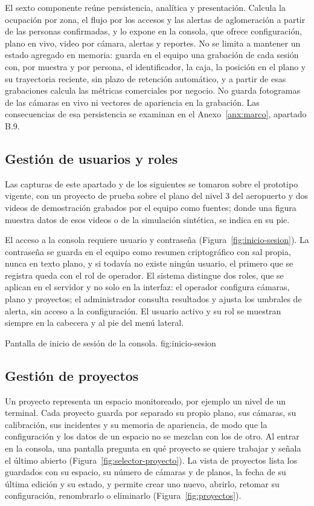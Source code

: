 El sexto componente reúne persistencia, analítica y presentación. Calcula la ocupación por
zona, el flujo por los accesos y las alertas de aglomeración a partir de las personas
confirmadas, y lo expone en la consola, que ofrece configuración, plano en vivo, video por
cámara, alertas y reportes. No se limita a mantener un estado agregado en memoria: guarda en
el equipo una grabación de cada sesión con, por muestra y por persona, el identificador, la caja,
la posición en el plano y su trayectoria reciente, sin plazo de retención automático, y a partir de
esas grabaciones calcula las métricas comerciales por negocio. No guarda fotogramas de las
cámaras en vivo ni vectores de apariencia en la grabación. Las consecuencias de esa
persistencia se examinan en el Anexo~\ref{anx:marco}, apartado B.9.

\subsection{Gestión de usuarios y roles}
\label{subsec:diseno-usuarios}

Las capturas de este apartado y de los siguientes se tomaron sobre el prototipo vigente, con un
proyecto de prueba sobre el plano del nivel 3 del aeropuerto y dos videos de demostración
grabados por el equipo como fuentes; donde una figura muestra datos de esos videos o de la
simulación sintética, se indica en su pie.

El acceso a la consola requiere usuario y contraseña (Figura~\ref{fig:inicio-sesion}). La
contraseña se guarda en el equipo como resumen criptográfico con sal propia, nunca en texto
plano, y si todavía no existe ningún usuario, el primero que se registra queda con el rol de
operador. El sistema distingue dos roles, que se aplican en el servidor y no solo en la interfaz:
el operador configura cámaras, plano y proyectos; el administrador consulta resultados y ajusta
los umbrales de alerta, sin acceso a la configuración. El usuario activo y su rol se muestran
siempre en la cabecera y al pie del menú lateral.

  {Pantalla de inicio de sesión de la consola.}
  {fig:inicio-sesion}

\subsection{Gestión de proyectos}
\label{subsec:diseno-proyectos}

Un proyecto representa un espacio monitoreado, por ejemplo un nivel de un terminal. Cada
proyecto guarda por separado su propio plano, sus cámaras, su calibración, sus incidentes y su
memoria de apariencia, de modo que la configuración y los datos de un espacio no se mezclan
con los de otro. Al entrar en la consola, una pantalla pregunta en qué proyecto se quiere
trabajar y señala el último abierto (Figura~\ref{fig:selector-proyecto}). La vista de proyectos
lista los guardados con su espacio, su número de cámaras y de planos, la fecha de su última
edición y su estado, y permite crear uno nuevo, abrirlo, retomar su configuración, renombrarlo o
eliminarlo (Figura~\ref{fig:proyectos}).

